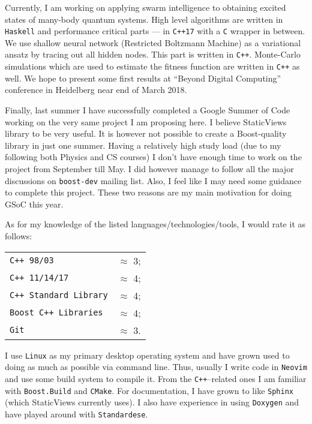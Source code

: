 \documentclass[a4paper,12pt]{article}
\begin{document}
    Currently, I am working on applying swarm intelligence to obtaining excited
    states of many-body quantum systems\cite{tcm-swarm}. High level algorithms
    are written in \texttt{Haskell} and performance critical parts --- in
    \texttt{C++17} with a \texttt{C} wrapper in between. We use shallow neural
    network (Restricted Boltzmann Machine) as a variational ansatz by tracing
    out all hidden nodes. This part is written in \texttt{C++}. Monte-Carlo
    simulations which are used to estimate the fitness function are written in
    \texttt{C++} as well. We hope to present some first results at ``Beyond
    Digital Computing'' conference in Heidelberg near end of March 2018.

    Finally, last summer I have successfully completed a Google Summer of Code
    working on the very same project I am proposing here. I believe StaticViews
    library to be very useful. It is however not possible to create a
    Boost-quality library in just one summer. Having a relatively high study
    load (due to my following both Physics and CS courses) I don't have enough
    time to work on the project from September till May. I did however manage to
    follow all the major discussions on \texttt{boost-dev} mailing list. Also, I
    feel like I may need some guidance to complete this project. These two
    reasons are my main motivation for doing GSoC this year.

    As for my knowledge of the listed languages/technologies/tools, I would rate
    it as follows:

    \begin{tabular}{l r}
        \texttt{C++ 98/03} & $\approx$ 3; \\
        \texttt{C++ 11/14/17} & $\approx$ 4; \\
        \texttt{C++ Standard Library} & $\approx$ 4; \\
        \texttt{Boost C++ Libraries} & $\approx$ 4; \\
        \texttt{Git} & $\approx$ 3.
    \end{tabular}

    I use \texttt{Linux} as my primary desktop operating system and have grown
    used to doing as much as possible via command line. Thus, usually I write
    code in \texttt{Neovim} and use some build system to compile it. From the
    \texttt{C++}--related ones I am familiar with \texttt{Boost.Build} and
    \texttt{CMake}. For documentation, I have grown to like \texttt{Sphinx}
    (which StaticViews currently uses). I also have experience in using
    \texttt{Doxygen} and have played around with \texttt{Standardese}.
\end{document}
